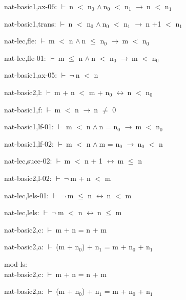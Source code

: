 \documentclass[a4paper]{article}
\newcommand{\Fol}{\mbox{$\vdash\ $}}
\newcommand{\Not}{\mbox{$\neg\ $}}
\newcommand{\And}{\mbox{$\wedge\ $}}
\newcommand{\Imp}{\mbox{$\rightarrow\ $}}
\newcommand{\Equiv}{\mbox{$\leftrightarrow\ $}}
\begin{document}
nat-basic1,ax-06: 
 \Fol n $<$ $\mbox{n}_{0}$ \And $\mbox{n}_{0}$ $<$ $\mbox{n}_{1}$ \Imp n $<$ $\mbox{n}_{1}$



nat-basic1,trans: 
 \Fol n $<$ $\mbox{n}_{0}$ \And $\mbox{n}_{0}$ $<$ $\mbox{n}_{1}$ \Imp n +1 $<$ $\mbox{n}_{1}$



nat-lec,fle: 
 \Fol m $<$ n \And n $\le$ $\mbox{n}_{0}$ \Imp m $<$ $\mbox{n}_{0}$



nat-lec,fle-01: 
 \Fol m $\le$ n \And n $<$ $\mbox{n}_{0}$ \Imp m $<$ $\mbox{n}_{0}$



nat-basic1,ax-05: 
 \Fol \Not n $<$ n



nat-basic2,l: 
 \Fol m + n $<$ m + $\mbox{n}_{0}$ \Equiv n $<$ $\mbox{n}_{0}$



nat-basic1,f: 
 \Fol m $<$ n \Imp n $\neq$ 0



nat-basic1,lf-01: 
 \Fol m $<$ n \And n = $\mbox{n}_{0}$ \Imp m $<$ $\mbox{n}_{0}$



nat-basic1,lf-02: 
 \Fol m $<$ n \And m = $\mbox{n}_{0}$ \Imp $\mbox{n}_{0}$ $<$ n



nat-lec,succ-02: 
 \Fol m $<$ n + 1 \Equiv m $\le$ n



nat-basic2,l-02: 
 \Fol \Not m + n $<$ m



nat-lec,lels-01: 
 \Fol \Not m $\le$ n \Equiv n $<$ m



nat-lec,lels: 
 \Fol \Not m $<$ n \Equiv n $\le$ m



nat-basic2,c: 
 \Fol m + n = n + m



nat-basic2,a: 
 \Fol (m + $\mbox{n}_{0}$) + $\mbox{n}_{1}$ = m + $\mbox{n}_{0}$ + $\mbox{n}_{1}$



\bigskip

mod-ls:\\ nat-basic2,c: 
 \Fol m + n = n + m



nat-basic2,a: 
 \Fol (m + $\mbox{n}_{0}$) + $\mbox{n}_{1}$ = m + $\mbox{n}_{0}$ + $\mbox{n}_{1}$
\end{document}
